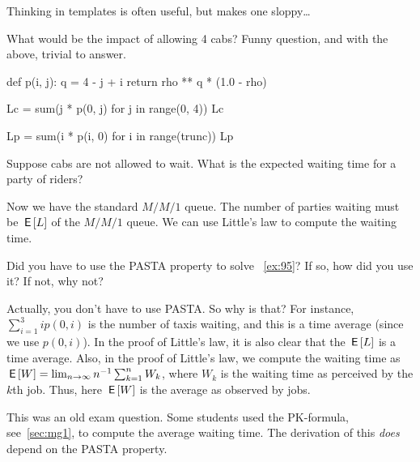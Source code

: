 \documentclass[companion]{subfiles}
\begin{document}
\begin{exercise}[Hall 5.22]
\begin{solution}
Thinking in templates is often useful, but makes one sloppy\ldots

What would be the impact of allowing 4 cabs? Funny question, and with the above, trivial to answer.

\begin{pyconsole}
def p(i, j):
    q = 4 - j + i
    return rho ** q * (1.0 - rho)

\end{pyconsole}

\begin{pyconsole}
Lc = sum(j * p(0, j) for j in range(0, 4))
Lc

Lp = sum(i * p(i, 0) for i in range(trunc))
Lp
\end{pyconsole}
\end{solution}
\end{exercise}


\begin{extra}
Suppose cabs are not allowed to wait. What is the expected waiting time for a party of riders?

\begin{solution}
Now we have the standard $M/M/1$ queue. The number of parties waiting must be $\,\mathsf{E}\left[L\right]$ of the $M/M/1$ queue. We can use Little's law to compute the waiting time.
\end{solution}
\end{extra}



\begin{exercise}
 Did you have to use the PASTA property to solve ~\cref{ex:95}? If so, how did you use it? If not, why not?
\begin{solution}
 Actually, you don't have to use PASTA.
 So why is that?
 For instance, $\sum_{i=1}^3 i p(0, i)$ is the number of taxis waiting, and this is a time average (since we use $p(0, i)$).
 In the proof of Little's law, it is also clear that the $\,\mathsf{E}\left[L\right]$ is a time average.
 Also, in the proof of Little's law, we compute the waiting time as $\,\mathsf{E}\left[W\right] = \lim_{n\to\infty} n^{-1}\sum_{k=1}^n W_k$, where $W_k$ is the waiting time as perceived by the $k$th job.
 Thus, here $\,\mathsf{E}\left[W\right]$ is the average as observed by jobs.

 This was an old exam question.
 Some students used the PK-formula, see~\cref{sec:mg1}, to compute the average waiting time.
 The derivation of this \emph{does} depend on the PASTA property.
\end{solution}
\end{exercise}
\end{document}
